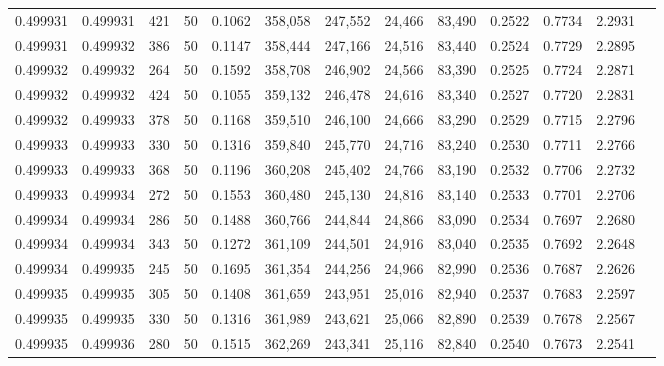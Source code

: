 \begin{tabular}{rrrrrrrrrrrrr}
0.499931 & 0.499931 &   421 &  50 &                                     0.1062 & 358,058 & 247,552 &  24,466 &  83,490 & 0.2522 & 0.7734 & 2.2931 \\
0.499931 & 0.499932 &   386 &  50 &                                     0.1147 & 358,444 & 247,166 &  24,516 &  83,440 & 0.2524 & 0.7729 & 2.2895 \\
0.499932 & 0.499932 &   264 &  50 &                                     0.1592 & 358,708 & 246,902 &  24,566 &  83,390 & 0.2525 & 0.7724 & 2.2871 \\
0.499932 & 0.499932 &   424 &  50 &                                     0.1055 & 359,132 & 246,478 &  24,616 &  83,340 & 0.2527 & 0.7720 & 2.2831 \\
0.499932 & 0.499933 &   378 &  50 &                                     0.1168 & 359,510 & 246,100 &  24,666 &  83,290 & 0.2529 & 0.7715 & 2.2796 \\
0.499933 & 0.499933 &   330 &  50 &                                     0.1316 & 359,840 & 245,770 &  24,716 &  83,240 & 0.2530 & 0.7711 & 2.2766 \\
0.499933 & 0.499933 &   368 &  50 &                                     0.1196 & 360,208 & 245,402 &  24,766 &  83,190 & 0.2532 & 0.7706 & 2.2732 \\
0.499933 & 0.499934 &   272 &  50 &                                     0.1553 & 360,480 & 245,130 &  24,816 &  83,140 & 0.2533 & 0.7701 & 2.2706 \\
0.499934 & 0.499934 &   286 &  50 &                                     0.1488 & 360,766 & 244,844 &  24,866 &  83,090 & 0.2534 & 0.7697 & 2.2680 \\
0.499934 & 0.499934 &   343 &  50 &                                     0.1272 & 361,109 & 244,501 &  24,916 &  83,040 & 0.2535 & 0.7692 & 2.2648 \\
0.499934 & 0.499935 &   245 &  50 &                                     0.1695 & 361,354 & 244,256 &  24,966 &  82,990 & 0.2536 & 0.7687 & 2.2626 \\
0.499935 & 0.499935 &   305 &  50 &                                     0.1408 & 361,659 & 243,951 &  25,016 &  82,940 & 0.2537 & 0.7683 & 2.2597 \\
0.499935 & 0.499935 &   330 &  50 &                                     0.1316 & 361,989 & 243,621 &  25,066 &  82,890 & 0.2539 & 0.7678 & 2.2567 \\
0.499935 & 0.499936 &   280 &  50 &                                     0.1515 & 362,269 & 243,341 &  25,116 &  82,840 & 0.2540 & 0.7673 & 2.2541 \\

\end{tabular}
